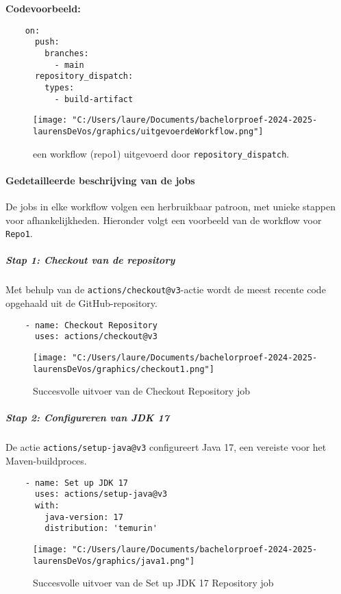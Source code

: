\textbf{Codevoorbeeld:}

\begin{verbatim}
    on:
      push:
        branches:
          - main
      repository_dispatch:
        types:
          - build-artifact
\end{verbatim}

\begin{figure}[h!]
    \centering
    \texttt{[image: "C:/Users/laure/Documents/bachelorproef-2024-2025-laurensDeVos/graphics/uitgevoerdeWorkflow.png"]}
    \caption{een workflow (repo1) uitgevoerd door \texttt{repository\_dispatch}.}
    \label{fig:uitgevoerdeWorkflow}
\end{figure}

\paragraph{Gedetailleerde beschrijving van de jobs}
De jobs in elke workflow volgen een herbruikbaar patroon, met unieke stappen voor afhankelijkheden. Hieronder volgt een voorbeeld van de workflow voor \texttt{Repo1}.

\subparagraph{Stap 1: Checkout van de repository}
Met behulp van de \texttt{actions/checkout@v3}-actie wordt de meest recente code opgehaald uit de GitHub-repository.

\begin{verbatim}
    - name: Checkout Repository
      uses: actions/checkout@v3
\end{verbatim}

\begin{figure}[h!]
    \centering
    \texttt{[image: "C:/Users/laure/Documents/bachelorproef-2024-2025-laurensDeVos/graphics/checkout1.png"]}
    \caption{Succesvolle uitvoer van de Checkout Repository job}
    \label{fig:check1}
\end{figure}

\subparagraph{Stap 2: Configureren van JDK 17}
De actie \texttt{actions/setup-java@v3} configureert Java 17, een vereiste voor het Maven-buildproces.

\begin{verbatim}
    - name: Set up JDK 17
      uses: actions/setup-java@v3
      with:
        java-version: 17
        distribution: 'temurin'
\end{verbatim}

\begin{figure}[h!]
    \centering
    \texttt{[image: "C:/Users/laure/Documents/bachelorproef-2024-2025-laurensDeVos/graphics/java1.png"]}
    \caption{Succesvolle uitvoer van de Set up JDK 17 Repository job}
\end{figure}

